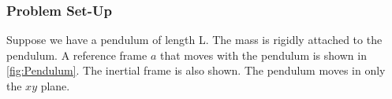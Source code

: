 \documentclass[12pt]{report}
\begin{document}
\subsubsection{Problem Set-Up}
Suppose we have a pendulum of length L. The mass is rigidly attached to the pendulum. A reference frame $a$ that moves with the pendulum is shown in \ref{fig:Pendulum}. The inertial frame is also shown. The pendulum moves in only the $xy$ plane.
\begin{figure}[ht]

\centering


\begin{tikzpicture}[x=0.75pt,y=0.75pt,yscale=-1,xscale=1]


\end{tikzpicture}
\end{figure}
\end{document}
